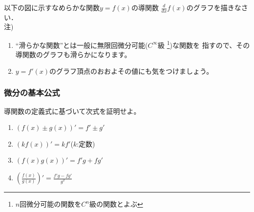 \documentclass[twocolumn,11pt]{jarticle}
\begin{document}
\nquestion
以下の図に示すなめらかな関数$y=f(x)$の導関数
$\displaystyle\frac{d}{dx}f(x)$のグラフを描きなさい．\\
注)
\begin{enumerate}
\item ``滑らかな関数''とは一般に無限回微分可能($C^\infty$級
\footnote{$n$回微分可能の関数を$C^n$級の関数とよぶ})な関数を
  指すので、その導関数のグラフも滑らかになります。
\item $y=f'(x)$のグラフ頂点のおおよその値にも気をつけましょう。
\end{enumerate}
\begin{center}  %
\end{center}


\subsubsection{微分の基本公式}

\nquestion
導関数の定義式に基づいて次式を証明せよ。
\begin{enumerate}
\item $(f(x)\pm g(x))'=f'\pm g'$
\item $(kf(x))'=kf'$\quad($k$:定数)
\item $(f(x)g(x))'=f'g+fg'$
\item $\displaystyle\left(\frac{f(x)}{g(x)}\right)'=\frac{f'g-fg'}{g^2}$
\end{enumerate}
\end{document}
